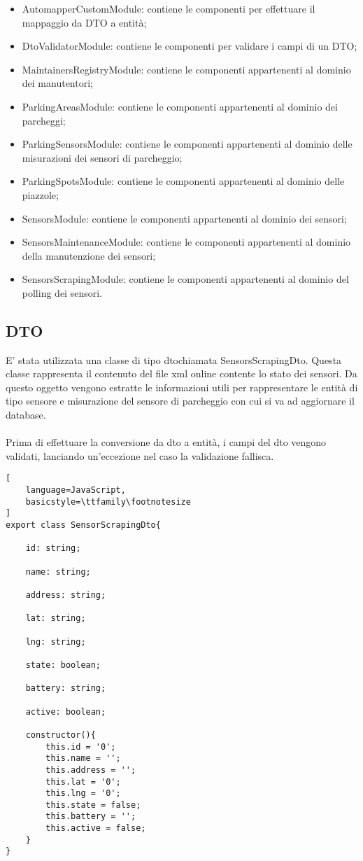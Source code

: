 \begin{itemize}
    \item AutomapperCustomModule: contiene le componenti per effettuare il mappaggio da DTO a entità;
    \item DtoValidatorModule: contiene le componenti per validare i campi di un DTO;
    \item MaintainersRegistryModule: contiene le componenti appartenenti al dominio dei manutentori;
    \item ParkingAreasModule: contiene le componenti appartenenti al dominio dei parcheggi;
    \item ParkingSensorsModule: contiene le componenti appartenenti al dominio delle misurazioni dei sensori di parcheggio;
    \item ParkingSpotsModule: contiene le componenti appartenenti al dominio delle piazzole;
    \item SensorsModule: contiene le componenti appartenenti al dominio dei sensori;
    \item SensorsMaintenanceModule: contiene le componenti appartenenti al dominio della manutenzione dei sensori;
    \item SensorsScrapingModule: contiene le componenti appartenenti al dominio del polling dei sensori.
\end{itemize}

\subsection{DTO}
E' stata utilizzata una classe di tipo \gls{dto}\glsfirstoccur chiamata SensorsScrapingDto. Questa classe rappresenta
il contenuto del file \gls{xml} online contente lo stato dei sensori. Da questo oggetto vengono estratte le informazioni
utili per rappresentare le entità di tipo sensore e misurazione del sensore di parcheggio con cui si va ad aggiornare il database.
\\\\
Prima di effettuare la conversione da \gls{dto} a entità, i campi del \gls{dto} vengono validati, lanciando un'eccezione nel caso 
la validazione fallisca.
\\
\begin{lstlisting}[
    language=JavaScript,
    basicstyle=\ttfamily\footnotesize
]
export class SensorScrapingDto{
    
    id: string;

    name: string;

    address: string;

    lat: string;

    lng: string;

    state: boolean;

    battery: string;

    active: boolean;

    constructor(){
        this.id = '0';
        this.name = '';
        this.address = '';
        this.lat = '0';
        this.lng = '0';
        this.state = false;
        this.battery = '';
        this.active = false;
    }
}
\end{lstlisting}

